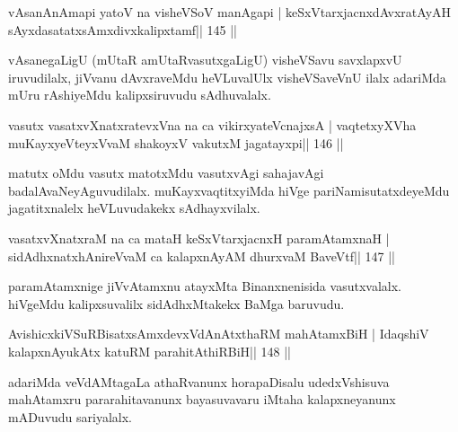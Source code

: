 

\begin{shl}
vAsanAnAmapi yatoV na visheVSoV manAgapi |
keSxVtarxjacnxdAvxratAyAH sAyxdasatatxsAmxdivxkalipxtamf\hfill || 145 ||
\end{shl}

\begin{artha}
vAsanegaLigU (mUtaR amUtaRvasutxgaLigU) visheVSavu savxlapxvU iruvudilalx, jiVvanu dAvxraveMdu heVLuvalUlx visheVSaveVnU ilalx adariMda mUru rAshiyeMdu kalipxsiruvudu sAdhuvalalx.
\end{artha}


\begin{shl}
vasutx vasatxvXnatxratevxVna na ca vikirxyateV\s cnajxsA |
vaqtetxyXVha muKayxyeVteyxVvaM shakoyxV vakutxM jagatayxpi\hfill || 146 ||
\end{shl}

\begin{artha}
matutx oMdu vasutx matotxMdu vasutxvAgi sahajavAgi  badalAvaNeyAguvudilalx. muKayxvaqtitxyiMda hiVge pariNamisutatxdeyeMdu jagatitxnalelx heVLuvudakekx sAdhayxvilalx.
\end{artha}

\begin{shl}
vasatxvXnatxraM na ca mataH keSxVtarxjacnxH paramAtamxnaH |
sidAdhxnatxhAnireVvaM ca kalapxnAyAM dhurxvaM BaveVtf\hfill || 147 ||
\end{shl}

\begin{artha}
paramAtamxnige jiVvAtamxnu atayxMta Binanxnenisida vasutxvalalx. hiVgeMdu kalipxsuvalilx sidAdhxMtakekx BaMga baruvudu.
\end{artha}


\begin{shl}
AvishicxkiVSuRBisatxsAmxdevxVdAnAtxthaRM mahAtamxBiH |
IdaqshiV kalapxnA\s yukAtx katuRM parahitAthiRBiH\hfill || 148 ||
\end{shl}

\begin{artha}
adariMda veVdAMtagaLa athaRvanunx horapaDisalu udedxVshisuva mahAtamxru pararahitavanunx bayasuvavaru iMtaha kalapxneyanunx mADuvudu sariyalalx.
\end{artha}

